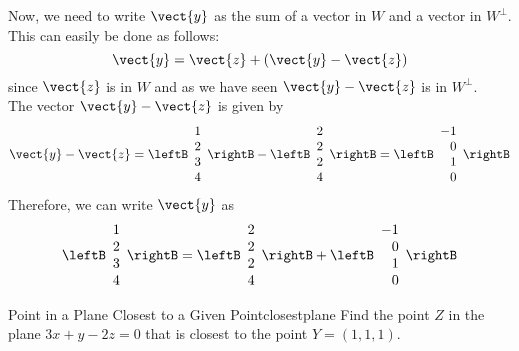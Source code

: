 \begin{solution}
Now, we need to write $\vect{y}$ as the sum of a vector in $W$ and a
vector in $W^{\perp}$. This can easily be done as follows:
\[
\vect{y} = \vect{z} + (\vect{y} - \vect{z})
\]
since $\vect{z}$ is in $W$ and as we have seen $\vect{y} - \vect{z}$ is in  $W^{\perp}$. \\
The vector $\vect{y} - \vect{z}$ is given by 
\[
\vect{y} - \vect{z} = \leftB
\begin{array}{c}
1 \\
2 \\
3 \\
4 
\end{array}
\rightB
-
\leftB
\begin{array}{c}
2 \\
2 \\
2 \\
4 
\end{array}
\rightB
 = 
\leftB
\begin{array}{r}
-1 \\
0 \\
1 \\
0
\end{array}
\rightB
\]
Therefore, we can write $\vect{y}$ as
\[
\leftB
\begin{array}{c}
1 \\
2 \\
3 \\
4 
\end{array}
\rightB
=
\leftB
\begin{array}{c}
2 \\
2 \\
2 \\
4 
\end{array}
\rightB
+
\leftB
\begin{array}{r}
-1 \\
0 \\
1 \\
0
\end{array}
\rightB
\]
\end{solution}

\begin{example}{Point in a Plane Closest to a Given Point}{closestplane}
Find the point $Z$ in the plane $3x+y-2z=0$ that is closest to
the point $Y=(1,1,1)$.
\end{example}

